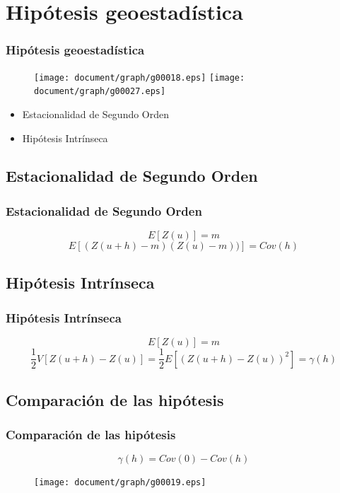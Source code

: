 \documentclass{beamer}
\begin{document}
\section{Hipótesis geoestadística}
\begin{frame}
\frametitle{Hipótesis geoestadística}
\begin{figure}
\texttt{[image: document/graph/g00018.eps]}
\texttt{[image: document/graph/g00027.eps]}
\end{figure}
\begin{itemize}
\item Estacionalidad de Segundo Orden
\item Hipótesis Intrínseca
\end{itemize}
\end{frame}


\subsection{Estacionalidad de Segundo Orden}
\begin{frame}
\frametitle{Estacionalidad de Segundo Orden}
\begin{equation}
E[Z(u)] = m
\end{equation}
\begin{equation}
E[(Z(u+h)-m)(Z(u)-m))] = Cov(h)
\label{eq:Covarianza}
\end{equation}
\end{frame}


\subsection{Hipótesis Intrínseca}
\begin{frame}
\frametitle{Hipótesis Intrínseca}
\begin{equation}
E[Z(u)] = m
\end{equation}
\begin{equation}
\frac{1}{2}V[Z(u+h)-Z(u)]=\frac{1}{2}E[(Z(u+h)-Z(u))^2] = \gamma(h)
\label{eq:Semivariograma}
\end{equation}
\end{frame}


\subsection{Comparación de las hipótesis}
\begin{frame}
\frametitle{Comparación de las hipótesis}
\begin{equation}
\label{eq:RelacionEntreSemivariogramaYCovarianza}
\gamma(h) = Cov(0) - Cov(h)
\end{equation}
\begin{figure}
\texttt{[image: document/graph/g00019.eps]}
\end{figure}
\end{frame}
\end{document}
